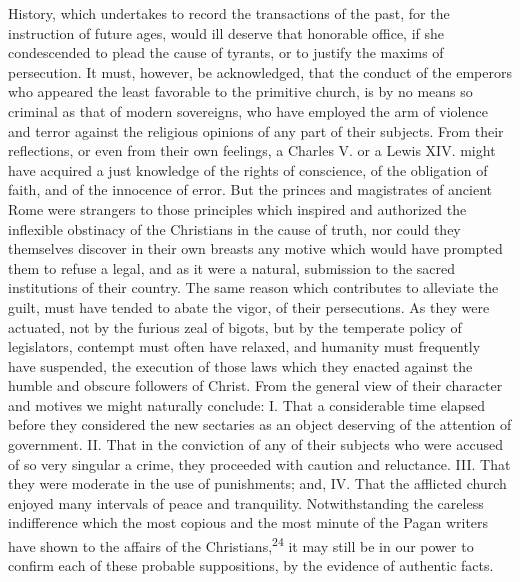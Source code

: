 History, which undertakes to record the transactions of the past,
for the instruction of future ages, would ill deserve that
honorable office, if she condescended to plead the cause of
tyrants, or to justify the maxims of persecution. It must,
however, be acknowledged, that the conduct of the emperors who
appeared the least favorable to the primitive church, is by no
means so criminal as that of modern sovereigns, who have employed
the arm of violence and terror against the religious opinions of
any part of their subjects. From their reflections, or even from
their own feelings, a Charles V. or a Lewis XIV. might have
acquired a just knowledge of the rights of conscience, of the
obligation of faith, and of the innocence of error. But the
princes and magistrates of ancient Rome were strangers to those
principles which inspired and authorized the inflexible obstinacy
of the Christians in the cause of truth, nor could they
themselves discover in their own breasts any motive which would
have prompted them to refuse a legal, and as it were a natural,
submission to the sacred institutions of their country. The same
reason which contributes to alleviate the guilt, must have tended
to abate the vigor, of their persecutions. As they were actuated,
not by the furious zeal of bigots, but by the temperate policy of
legislators, contempt must often have relaxed, and humanity must
frequently have suspended, the execution of those laws which they
enacted against the humble and obscure followers of Christ. From
the general view of their character and motives we might
naturally conclude: I. That a considerable time elapsed before
they considered the new sectaries as an object deserving of the
attention of government. II. That in the conviction of any of
their subjects who were accused of so very singular a crime, they
proceeded with caution and reluctance. III. That they were
moderate in the use of punishments; and, IV. That the afflicted
church enjoyed many intervals of peace and tranquility.
Notwithstanding the careless indifference which the most copious
and the most minute of the Pagan writers have shown to the
affairs of the Christians,\textsuperscript{24} it may still be in our power to
confirm each of these probable suppositions, by the evidence of
authentic facts.


